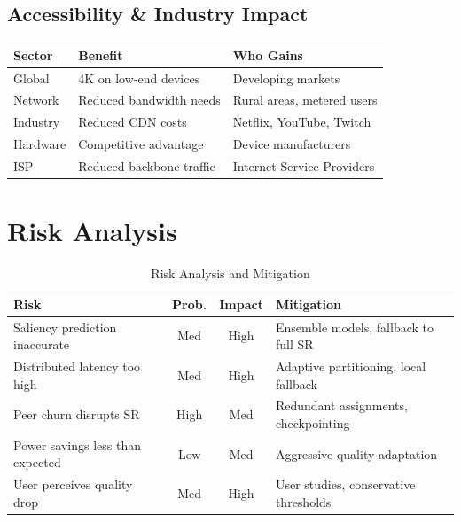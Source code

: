 \documentclass[11pt, a4paper]{article}
\begin{document}
\subsection{Accessibility \& Industry Impact}

\begin{table}[H]
\centering
\begin{tabular}{>{\centering}p{2cm} p{5cm} p{5cm}}
\toprule
\textbf{Sector} & \textbf{Benefit} & \textbf{Who Gains} \\
\midrule
\rowcolor{lightbg} Global & 4K on low-end devices & Developing markets \\
Network & Reduced bandwidth needs & Rural areas, metered users \\
\rowcolor{lightbg} Industry & Reduced CDN costs & Netflix, YouTube, Twitch \\
Hardware & Competitive advantage & Device manufacturers \\
\rowcolor{lightbg} ISP & Reduced backbone traffic & Internet Service Providers \\
\bottomrule
\end{tabular}
\end{table}

\section{Risk Analysis}

\begin{table}[H]
\centering
\caption{Risk Analysis and Mitigation}
\begin{tabular}{>{\raggedright}p{3.5cm} c c p{5cm}}
\toprule
\textbf{Risk} & \textbf{Prob.} & \textbf{Impact} & \textbf{Mitigation} \\
\midrule
\rowcolor{warningred!8} Saliency prediction inaccurate & Med & High & Ensemble models, fallback to full SR \\
Distributed latency too high & Med & High & Adaptive partitioning, local fallback \\
\rowcolor{warningred!8} Peer churn disrupts SR & High & Med & Redundant assignments, checkpointing \\
Power savings less than expected & Low & Med & Aggressive quality adaptation \\
\rowcolor{warningred!8} User perceives quality drop & Med & High & User studies, conservative thresholds \\
\bottomrule
\end{tabular}
\end{table}
\end{document}
